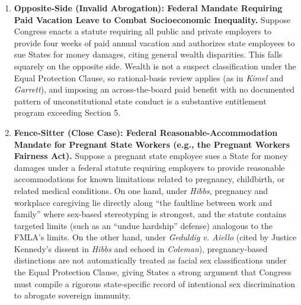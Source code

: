 \documentclass[12pt]{article}
\begin{document}
\begin{enumerate}
\item \textbf{Opposite-Side (Invalid Abrogation): Federal Mandate Requiring Paid Vacation Leave to Combat Socioeconomic Inequality.} Suppose Congress enacts a statute requiring all public and private employers to provide four weeks of paid annual vacation and authorizes state employees to sue States for money damages, citing general wealth disparities. This falls squarely on the opposite side. Wealth is not a suspect classification under the Equal Protection Clause, so rational-basis review applies (as in \textit{Kimel} and \textit{Garrett}), and imposing an across-the-board paid benefit with no documented pattern of unconstitutional state conduct is a substantive entitlement program exceeding Section 5.

\item \textbf{Fence-Sitter (Close Case): Federal Reasonable-Accommodation Mandate for Pregnant State Workers (e.g., the Pregnant Workers Fairness Act).} Suppose a pregnant state employee sues a State for money damages under a federal statute requiring employers to provide reasonable accommodations for known limitations related to pregnancy, childbirth, or related medical conditions. On one hand, under \textit{Hibbs}, pregnancy and workplace caregiving lie directly along ``the faultline between work and family'' where sex-based stereotyping is strongest, and the statute contains targeted limits (such as an ``undue hardship'' defense) analogous to the FMLA's limits. On the other hand, under \textit{Geduldig v. Aiello} (cited by Justice Kennedy's dissent in \textit{Hibbs} and echoed in \textit{Coleman}), pregnancy-based distinctions are not automatically treated as facial sex classifications under the Equal Protection Clause, giving States a strong argument that Congress must compile a rigorous state-specific record of intentional sex discrimination to abrogate sovereign immunity.
\end{enumerate}
\end{document}
